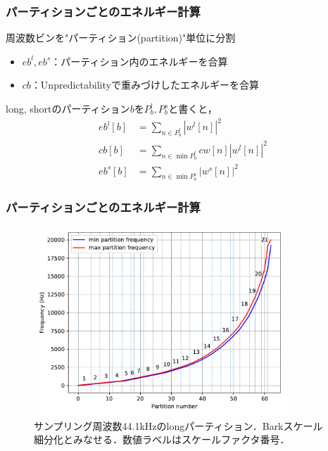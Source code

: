\documentclass[14pt,xcolor=dvipsnames,table,dvipdfmx]{beamer}
\begin{document}
\begin{frame}[c]
    \frametitle{パーティションごとのエネルギー計算}
    周波数ビンを"パーティション(partition)"単位に分割
    \begin{itemize}
        \item $eb^{l}, eb^{s}$：パーティション内のエネルギーを合算
        \item $cb$：Unpredictabilityで重みづけしたエネルギーを合算
    \end{itemize}
    long, shortのパーティション$b$を$P^{l}_{b}, P^{s}_{b}$と書くと，
    \small
    \begin{align}
        eb^{l}[b] &= \sum_{n \in P^{l}_{b}} |w^{l}[n]|^{2} \\
        cb[b] &= \sum_{n \in \min P^{l}_{b}} cw[n] |w^{l}[n]|^{2} \\
        eb^{s}[b] &= \sum_{n \in \min P^{s}_{b}} |w^{s}[n]|^{2}
    \end{align}
\end{frame}

\begin{frame}[c]
    \frametitle{パーティションごとのエネルギー計算}
    \begin{figure}
        \includegraphics[width=95mm]{./figs/partion_frequency_long44100Hz.pdf}
        \caption*{サンプリング周波数44.1kHzのlongパーティション．Barkスケール細分化とみなせる．数値ラベルはスケールファクタ番号．}
    \end{figure}
\end{frame}
\end{document}
